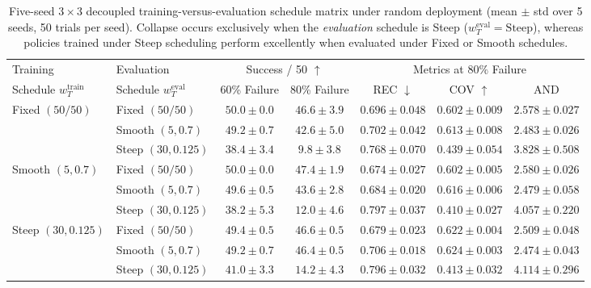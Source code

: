 \documentclass[11pt]{article}
\theoremstyle{plain}
\theoremstyle{definition}
\theoremstyle{remark}
\begin{document}
\begin{table}[t]
\centering
\caption{Five-seed $3 \times 3$ decoupled training-versus-evaluation schedule matrix under random deployment (mean $\pm$ std over 5 seeds, 50 trials per seed). Collapse occurs exclusively when the \emph{evaluation} schedule is Steep ($w_T^{\mathrm{eval}} = \text{Steep}$), whereas policies trained under Steep scheduling perform excellently when evaluated under Fixed or Smooth schedules.}
\label{tab:decouple-matrix}
\scriptsize
\begin{tabular}{@{}llccccc@{}}
\toprule
Training & Evaluation & \multicolumn{2}{c}{Success / 50 $\uparrow$} & \multicolumn{3}{c}{Metrics at $80\%$ Failure} \\
\cmidrule(lr){3-4}\cmidrule(lr){5-7}
Schedule $w_T^{\mathrm{train}}$ & Schedule $w_T^{\mathrm{eval}}$ & 60\% Failure & 80\% Failure & REC $\downarrow$ & COV $\uparrow$ & AND \\
\midrule
\multirow{3}{*}{Fixed $(50/50)$}
 & Fixed $(50/50)$        & $50.0\pm0.0$ & $\mathbf{46.6\pm3.9}$ & $0.696\pm0.048$ & $0.602\pm0.009$ & $2.578\pm0.027$ \\
 & Smooth $(5, 0.7)$      & $49.2\pm0.7$ & $42.6\pm5.0$          & $0.702\pm0.042$ & $0.613\pm0.008$ & $2.483\pm0.026$ \\
 & Steep $(30, 0.125)$    & $38.4\pm3.4$ & $9.8\pm3.8$           & $0.768\pm0.070$ & $0.439\pm0.054$ & $3.828\pm0.508$ \\
\midrule
\multirow{3}{*}{Smooth $(5, 0.7)$}
 & Fixed $(50/50)$        & $50.0\pm0.0$ & $\mathbf{47.4\pm1.9}$ & $\mathbf{0.674\pm0.027}$ & $0.602\pm0.005$ & $2.580\pm0.026$ \\
 & Smooth $(5, 0.7)$      & $49.6\pm0.5$ & $43.6\pm2.8$          & $0.684\pm0.020$ & $0.616\pm0.006$ & $2.479\pm0.058$ \\
 & Steep $(30, 0.125)$    & $38.2\pm5.3$ & $12.0\pm4.6$          & $0.797\pm0.037$ & $0.410\pm0.027$ & $4.057\pm0.220$ \\
\midrule
\multirow{3}{*}{Steep $(30, 0.125)$}
 & Fixed $(50/50)$        & $49.4\pm0.5$ & $\mathbf{46.6\pm0.5}$ & $0.679\pm0.023$ & $0.622\pm0.004$ & $2.509\pm0.048$ \\
 & Smooth $(5, 0.7)$      & $49.2\pm0.7$ & $\mathbf{46.4\pm0.5}$ & $0.706\pm0.018$ & $\mathbf{0.624\pm0.003}$ & $\mathbf{2.474\pm0.043}$ \\
 & Steep $(30, 0.125)$    & $41.0\pm3.3$ & $14.2\pm4.3$          & $0.796\pm0.032$ & $0.413\pm0.032$ & $4.114\pm0.296$ \\
\bottomrule
\end{tabular}
\end{table}
\end{document}
